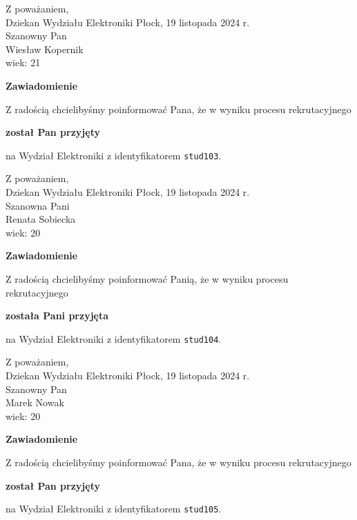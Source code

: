 \documentclass[12pt,a4paper]{article}
\begin{document}
\noindent
Z poważaniem,\\
Dziekan
Wydziału Elektroniki
\newpage
\hfill Płock, 19 listopada 2024 r.\\ 
\noindent 
Szanowny Pan \\
Wiesław Kopernik \\
wiek: 21

\bigskip

\begin{center}
{\Large\textbf{Zawiadomienie}}
\end{center}
\bigskip
Z radością chcielibyśmy poinformować Pana, że w wyniku procesu rekrutacyjnego
\begin{center}
\textsf{\textbf{został Pan przyjęty}} 
\end{center}
na Wydział Elektroniki z identyfikatorem \verb|stud103|.
\vspace{2cm}

\noindent
Z poważaniem,\\
Dziekan
Wydziału Elektroniki
\newpage
\hfill Płock, 19 listopada 2024 r.\\ 
\noindent 
Szanowna Pani \\
Renata Sobiecka  \\
wiek: 20

\bigskip

\begin{center}
{\Large\textbf{Zawiadomienie}}
\end{center}
\bigskip
Z radością chcielibyśmy poinformować Panią, że w wyniku procesu rekrutacyjnego
\begin{center}
\textsf{\textbf{została Pani przyjęta}} 
\end{center}
na Wydział Elektroniki z identyfikatorem \verb|stud104|.
\vspace{2cm}

\noindent
Z poważaniem,\\
Dziekan
Wydziału Elektroniki
\newpage
\hfill Płock, 19 listopada 2024 r.\\ 
\noindent 
Szanowny Pan \\
Marek Nowak \\
wiek: 20

\bigskip

\begin{center}
{\Large\textbf{Zawiadomienie}}
\end{center}
\bigskip
Z radością chcielibyśmy poinformować Pana, że w wyniku procesu rekrutacyjnego
\begin{center}
\textsf{\textbf{został Pan przyjęty}} 
\end{center}
na Wydział Elektroniki z identyfikatorem \verb|stud105|.
\vspace{2cm}
\end{document}
